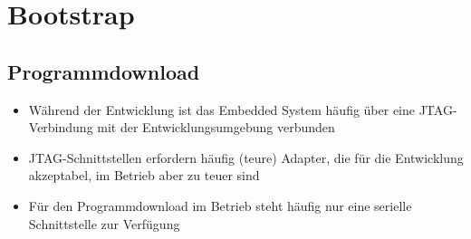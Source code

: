 \section{Bootstrap}
\subsection{Programmdownload }
\begin{itemize}
	\item Während der Entwicklung ist das Embedded System häufig über eine JTAG-Verbindung mit der Entwicklungsumgebung verbunden 
	\item JTAG-Schnittstellen erfordern häufig (teure) Adapter, die für die Entwicklung akzeptabel, im Betrieb aber zu teuer sind
	\item Für den Programmdownload im Betrieb steht häufig nur eine serielle Schnittstelle zur Verfügung
\end{itemize}
